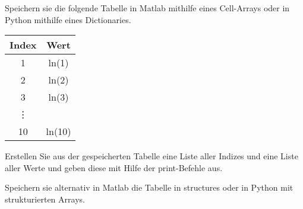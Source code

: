 \begin{aufg}[0]
Speichern sie die folgende Tabelle in Matlab mithilfe eines Cell-Arrays oder in Python mithilfe eines Dictionaries. 
\begin{center}
\begin{tabular}[c]{cc}
  Index & Wert\\
  \hline
  1 & ln(1)\\
  2 & ln(2)\\
  3 & ln(3)\\
  \vdots\\
  10 & ln(10)\\
\end{tabular}
\end{center}
Erstellen Sie aus der gespeicherten Tabelle eine Liste aller Indizes und eine Liste aller Werte und geben diese 
mit Hilfe der print-Befehle aus.

Speichern sie alternativ in Matlab die Tabelle in structures oder in Python mit strukturierten Arrays.

\end{aufg}
